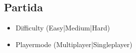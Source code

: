 \subsection{Partida}
\begin{itemize}
    \item Difficulty (Easy|Medium|Hard)
    \item Playermode (Multiplayer|Singleplayer)
\end{itemize}